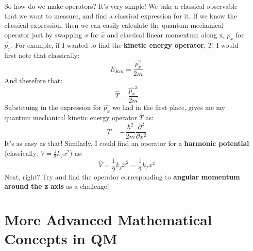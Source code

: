 \documentclass{memoir}[11pt,oneside,a4paper,openany]
\begin{document}
So how do we make operators? It's very simple! We take a classical observable that we want to measure, and find a classical expression for it. If we know the classical expression, then we can easily calculate the quantum mechanical operator just by swapping $x$ for $\hat{x}$ and classical linear momentum along x, $p_x$ for $\hat{p_x}$. For example, if I wanted to find the \textbf{kinetic energy operator}, $\hat{T}$, I would first note that classically:
\begin{equation}
	E_{Kin} = \frac{p_x^2}{2m}
\end{equation}
And therefore that:
\begin{equation}
	\hat{T} = \frac{\hat{p_x}^2}{2m}
\end{equation}
Substituing in the expression for $\hat{p_x}$ we had in the first place, gives me my quantum mechanical kinetic energy operator $\hat{T}$ as:
\begin{equation}
	\hat{T} = -\frac{\hbar^2}{2m}\frac{\partial^2}{\partial x^2}
\end{equation}
It's as easy as that! Similarly, I could find an operator for a \textbf{harmonic potential} (classically: $V = \frac{1}{2}k_fx^2$) as:
\begin{equation}
	\hat{V} = \frac{1}{2}k_f\hat{x}^2 = \frac{1}{2}k_fx^2
\end{equation}
Neat, right? Try and find the operator corresponding to \textbf{angular momentum around the z axis} as a challenge!

\chapter{More Advanced Mathematical Concepts in QM}
\end{document}
